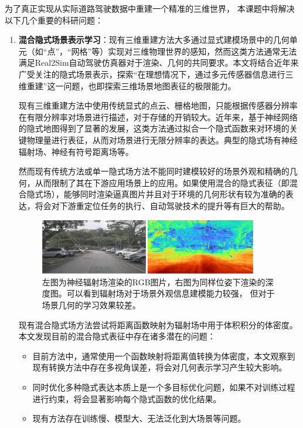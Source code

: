 为了真正实现从实际道路驾驶数据中重建一个精准的三维世界， 本课题中将解决以下几个重要的科研问题：
\begin{enumerate}
    \item \textbf{混合隐式场景表示学习}：现有三维重建方法大多通过显式建模场景中的几何单元（如“点”，“网格”等）实现对三维物理世界的感知，然而这类方法通常无法满足Real2Sim自动驾驶仿真器对于渲染、几何的共同要求。本文将结合近年来广受关注的隐式场景表示，探索“在理想情况下，通过多元传感器信息进行三维重建”这一问题，也即探索三维场景地图表征的极限能力。

    现有三维重建方法中使用传统显式的点云、栅格地图，只能根据传感器分辨率在有限分辨率对场景进行描述，对于存储的开销较大。近年来，基于神经网络的隐式地图得到了显著的发展，这类方法通过拟合一个隐式函数来对环境的关键物理量进行表征，从而对场景进行无限分辨率的表达。典型的隐式场有神经辐射场、神经有符号距离场等。

    然而现有传统方法或单一隐式场方法不能同时建模较好的场景外观和精确的几何，从而限制了其在下游应用场景上的应用。如果使用混合的隐式表征（即混合隐式场），能够同时渲染逼真图片并且对于环境的几何形状有较为准确的表达，将会对下游重定位任务的执行、自动驾驶技术的提升等有巨大的帮助。
    
    \begin{figure}[t]
        \centering
        \includegraphics[width=0.9\textwidth]{undergraduate-thesis/images/RGB-D.pdf}
        \caption{左图为神经辐射场渲染的RGB图片，右图为同样位姿下渲染的深度图。可以看到辐射场对于场景外观信息建模能力较强， 但对于场景几何的学习效果较差。}
        \label{fig:rgb-d}
    \end{figure}
    
    现有混合隐式场方法尝试将距离函数映射为辐射场中用于体积积分的体密度\cite{wang_neus_2021, azinovic_neural_2022}。本文发现目前的混合隐式表征中存在诸多潜在的问题：
    \begin{itemize}
        \item 目前方法中，通常使用一个函数映射将距离值转换为体密度，本文观察到现有转换方法中存在多视角误差，将会对几何表示学习产生较大影响。
        \item 同时优化多种隐式表达本质上是一个多目标优化问题，如果不对训练过程进行约束，将会显著影响每个隐式函数的优化结果。
        \item 现有方法存在训练慢、模型大、无法泛化到大场景等问题。
    \end{itemize}
    

\end{enumerate}
